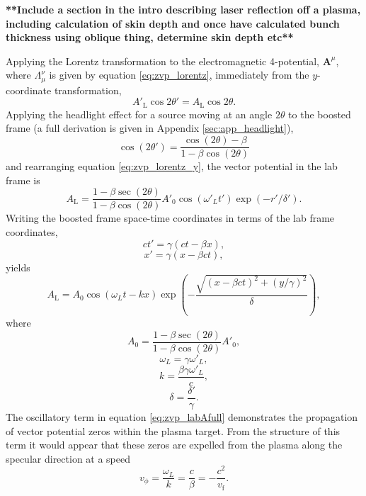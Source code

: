 \textbf{**Include a section in the intro describing laser reflection off a plasma, including calculation of skin depth and once have calculated bunch thickness using oblique thing, determine skin depth etc**}

Applying the Lorentz transformation to the electromagnetic 4-potential, $\mathbf{A}^\mu$, where $\Lambda_\mu^\nu$ is given by equation \ref{eq:zvp_lorentz}, immediately from the $y$-coordinate transformation,
\begin{equation}\label{eq:zvp_lorentz_y}
	A'_\mathrm{L}\cos{2\theta'} = A_\mathrm{L}\cos{2\theta}.
\end{equation}
Applying the headlight effect for a source moving at an angle $2\theta$ to the boosted frame (a full derivation is given in Appendix \ref{sec:app_headlight}),
\begin{equation}
	\cos{(2\theta')} = \frac{\cos{(2\theta)}-\beta}{1 - \beta\cos{(2\theta)}}
\end{equation}
and rearranging equation \ref{eq:zvp_lorentz_y}, the vector potential in the lab frame is
\begin{equation}\label{eq:zvp_labA}
	A_\mathrm{L} = \frac{1-\beta \sec{(2\theta)}}{1 - \beta\cos{(2\theta)}} A'_0\cos{(\omega'_L t')}\exp{(-r'/\delta')}.
\end{equation}
Writing the boosted frame space-time coordinates in terms of the lab frame coordinates,
\begin{equation}
	ct' = \gamma(ct-\beta x),
\end{equation}
\begin{equation}
	x' = \gamma(x-\beta ct),
\end{equation}
yields
\begin{equation}\label{eq:zvp_labAfull}
	A_\mathrm{L} =  A_0\cos{(\omega_L t - kx)}\exp{\left(-\frac{\sqrt{(x-\beta ct)^2+(y/\gamma)^2}}{\delta}\right)},
\end{equation}
where
\begin{equation}
	A_0 = \frac{1-\beta \sec{(2\theta)}}{1 - \beta\cos{(2\theta)}}A'_0,
\end{equation}
\begin{equation}
	\omega_L = \gamma \omega'_L,
\end{equation}
\begin{equation}
	k = \frac{\beta \gamma\omega'_L}{c},
\end{equation}
\begin{equation}
	\delta = \frac{\delta'}{\gamma}.
\end{equation}
The oscillatory term in equation \ref{eq:zvp_labAfull} demonstrates the propagation of vector potential zeros within the plasma target. From the structure of this term it would appear that these zeros are expelled from the plasma along the specular direction at a speed
\begin{equation}
	v_\phi = \frac{\omega_L}{k} = \frac{c}{\beta} = -\frac{c^2}{v_\mathrm{f}}.
\end{equation}

